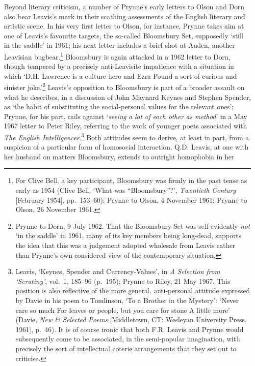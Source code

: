 \documentclass[]{article}
\begin{document}
Beyond literary criticism, a number of Prynne’s early letters to Olson
and Dorn also bear Leavis’s mark in their scathing assessments of the
English literary and artistic scene. In his very first letter to Olson,
for instance, Prynne takes aim at one of Leavis’s favourite targets, the
so-called Bloomsbury Set, supposedly ‘still in the saddle’ in 1961; his
next letter includes a brief shot at Auden, another Leavisian
bugbear.\footnote{For Clive Bell, a key participant, Bloomsbury was
  firmly in the past tense as early as 1954 (Clive Bell, ‘What was
  “Bloomsbury”?’, \emph{Twentieth Century} {[}February 1954{]},
  pp.~153–60); Prynne to Olson, 4 November 1961; Prynne to Olson, 26
  November 1961.} Bloomsbury is again attacked in a 1962 letter to Dorn,
though tempered by a precisely anti-Leavisite impatience with a
situation in which ‘D.H. Lawrence is a culture-hero and Ezra Pound a
sort of curious and sinister joke.’\footnote{Prynne to Dorn, 9 July
  1962. That the Bloomsbury Set was self-evidently \emph{not} ‘in the
  saddle’ in 1961, many of its key members being long-dead, supports the
  idea that this was a judgement adopted wholesale from Leavis rather
  than Prynne’s own considered view of the contemporary situation.}
Leavis’s opposition to Bloomsbury is part of a broader assault on what
he describes, in a discussion of John Maynard Keynes and Stephen
Spender, as ‘the habit of substituting the social-personal values for
the relevant ones’; Prynne, for his part, rails against ‘\emph{seeing a
lot of each other as method}’ in a May 1967 letter to Peter Riley,
referring to the work of younger poets associated with \emph{The English
Intelligencer}.\footnote{Leavis, ‘Keynes, Spender and Currency-Values’,
  in \emph{A Selection from ‘Scrutiny’}, vol.~1, 185–96 (p.~195); Prynne
  to Riley, 21 May 1967. This position is also reflective of the more
  general, anti-personal attitude expressed by Davie in his poem to
  Tomlinson, ‘To a Brother in the Mystery’: ‘Never care so much
  \textbar{} For leaves or people, but you care for stone \textbar{} A
  little more’ (Davie, \emph{New \& Selected Poems} {[}Middletown, CT:
  Wesleyan University Press, 1961{]}, p.~46). It is of course ironic
  that both F.R. Leavis and Prynne would subsequently come to be
  associated, in the semi-popular imagination, with precisely the sort
  of intellectual coterie arrangements that they set out to criticise.}
Both attitudes seem to derive, at least in part, from a suspicion of a
particular form of homosocial interaction. Q.D. Leavis, at one with her
husband on matters Bloomsbury, extends to outright homophobia in her
\end{document}
